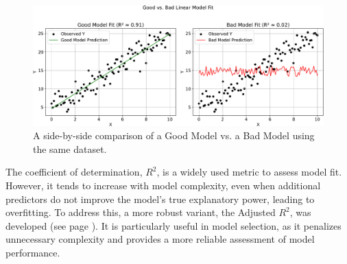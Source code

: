 \begin{figure}[!htp]
    \centering
    \includegraphics[width=\textwidth]{img/linear-regression/model-evaluation.pdf}
    \caption{A side-by-side comparison of a Good Model vs. a Bad Model using the same dataset.}
    \label{fig: good vs bad model}
\end{figure}

\noindent
The coefficient of determination, $R^2$, is a widely used metric to assess model fit. However, it tends to increase with model complexity, even when additional predictors do not improve the model's true explanatory power, leading to overfitting. To address this, a more robust variant, the Adjusted $R^2$, was developed (see page \pageref{paragraph: Adjusted R2}). It is particularly useful in model selection, as it penalizes unnecessary complexity and provides a more reliable assessment of model performance.

\newpage

